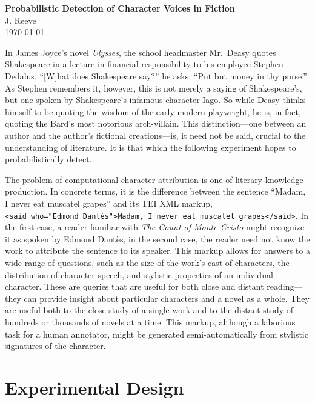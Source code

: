 \documentclass[12pt]{article}
\begin{document}
\begin{center}
  \Large \textbf{Probabilistic Detection of Character Voices in Fiction} \\
  \vspace{0.1in}
  \normalsize J. Reeve \\
  \today
\end{center}

In James Joyce's novel \emph{Ulysses}, the school headmaster Mr.~Deasy
quotes Shakespeare in a lecture in financial responsibility to his
employee Stephen Dedalus. ``{[}W{]}hat does Shakespeare say?'' he asks,
``Put but money in thy purse.'' As Stephen remembers it, however, this
is not merely a saying of Shakespeare's, but one spoken by Shakespeare's
infamous character Iago. So while Deasy thinks himself to be quoting the
wisdom of the early modern playwright, he is, in fact, quoting the
Bard's most notorious arch-villain. This distinction---one between an
author and the author's fictional creations---is, it need not be said,
crucial to the understanding of literature. It is that which the
following experiment hopes to probabilistically detect.

The problem of computational character attribution is one of literary
knowledge production. In concrete terms, it is the difference between
the sentence ``Madam, I never eat muscatel grapes'' and its TEI XML
markup,
\texttt{\textless{}said\ who="Edmond\ Dantès"\textgreater{}Madam,\ I\ never\ eat\ muscatel\ grapes\textless{}/said\textgreater{}}.
In the first case, a reader familiar with \emph{The Count of Monte
Cristo} might recognize it as spoken by Edmond Dantès, in the second
case, the reader need not know the work to attribute the sentence to its
speaker. This markup allows for answers to a wide range of questions,
such as the size of the work's cast of characters, the distribution of
character speech, and stylistic properties of an individual character.
These are queries that are useful for both close and distant
reading---they can provide insight about particular characters and a
novel as a whole. They are useful both to the close study of a single
work and to the distant study of hundreds or thousands of novels at a
time. This markup, although a laborious task for a human annotator,
might be generated semi-automatically from stylistic signatures of the
character.

\section{Experimental Design}\label{experimental-design}
\end{document}

